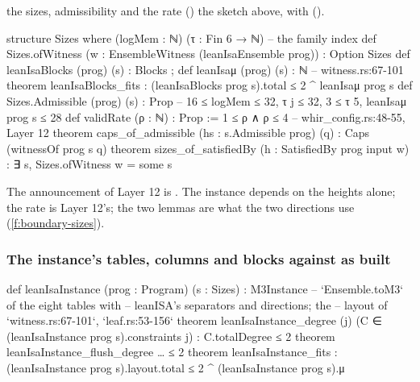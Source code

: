 \begin{change}{the sizes, admissibility and the rate ()}
\asis the sketch above, with 
().
\asproposed
\begin{leancode}
structure Sizes where (logMem : ℕ) (τ : Fin 6 → ℕ)                 -- the family index
def Sizes.ofWitness (w : EnsembleWitness (leanIsaEnsemble prog)) : Option Sizes
def leanIsaBlocks (prog) (s) : Blocks ; def leanIsaμ (prog) (s) : ℕ  -- witness.rs:67-101
theorem leanIsaBlocks_fits : (leanIsaBlocks prog s).total ≤ 2 ^ leanIsaμ prog s
def Sizes.Admissible (prog) (s) : Prop  -- 16 ≤ logMem ≤ 32, τ j ≤ 32, 3 ≤ τ 5, leanIsaμ prog s ≤ 28
def validRate (ρ : ℕ) : Prop := 1 ≤ ρ ∧ ρ ≤ 4                        -- whir_config.rs:48-55, Layer 12
theorem caps_of_admissible (hs : s.Admissible prog) (q) : Caps (witnessOf prog s q)
theorem sizes_of_satisfiedBy (h : SatisfiedBy prog input w) : ∃ s, Sizes.ofWitness w = some s
\end{leancode}
The announcement of Layer 12 is .
\reason The instance depends on the heights alone; the rate is Layer 12's; the two lemmas are what
the two directions use (\cref{f:boundary-sizes}).
\end{change}

\subsubsection{The instance's tables, columns and blocks against \texorpdfstring{\protect{}}{M3Instance} as built}\label{sec:gen-boundary-st-tables}

\begin{leancode}
def leanIsaInstance (prog : Program) (s : Sizes) : M3Instance   -- `Ensemble.toM3` of the eight tables with
                                                               -- leanISA's separators and directions; the
                                                               -- layout of `witness.rs:67-101`, `leaf.rs:53-156`
theorem leanIsaInstance_degree (j) (C ∈ (leanIsaInstance prog s).constraints j) : C.totalDegree ≤ 2
theorem leanIsaInstance_flush_degree …  ≤ 2
theorem leanIsaInstance_fits : (leanIsaInstance prog s).layout.total ≤ 2 ^ (leanIsaInstance prog s).μ
\end{leancode}

